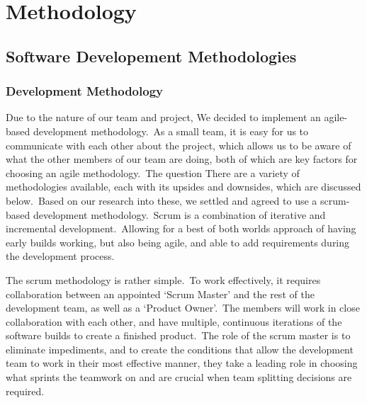 \chapter{Methodology} \label{ch:methodology}
    \section{Software Developement Methodologies}
        \subsection{Development Methodology}
            Due to the nature of our team and project, We decided to implement an agile-based development methodology.\
            As a small team, it is easy for us to communicate with each other about the project, which allows us to be
            aware of what the other members of our team are doing, both of which are key factors for choosing an agile
            methodology.\ The question There are a variety of methodologies available, each with its upsides and
            downsides, which are discussed below.\ Based on our research into these, we settled and agreed to use a
            scrum-based development methodology.\ Scrum is a combination of iterative and incremental development.\
            Allowing for a best of both worlds approach of having early builds working, but also being agile, and able
            to add requirements during the development process\cite{srivastava_2017_scrum}.

            The scrum methodology is rather simple.\ To work effectively, it requires collaboration between an appointed
            ‘Scrum Master’ and the rest of the development team, as well as a ‘Product Owner’.\ The members will work in
            close collaboration with each other, and have multiple, continuous iterations of the software builds to
            create a finished product.\ The role of the scrum master is to eliminate
            impediments\cite{srivastava_2017_scrum}, and to create the conditions that allow the development team to
            work in their most effective manner, they take a leading role in choosing what sprints the teamwork on and
            are crucial when team splitting decisions are required.

